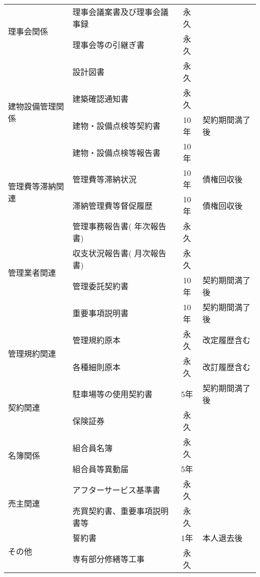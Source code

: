 \documentclass[12pt,uplatex]{jsarticle}
\begin{document}
\begin{table}[htbp]
{\begin{tabular}{|l|l|c|l|}
                                \hline
      \multirow{2}{*}{理事会関係} & 理事会議案書及び理事会議事録 & 永久 &  \\ \cline{2-4}
                                & 理事会等の引継ぎ書 & 永久 & \\ \cline{2-4}
                                \hline
      \multirow{4}{*}{建物設備管理関係} & 設計図書 & 永久 & \\ \cline{2-4}
                                & 建築確認通知書 & 永久 & \\ \cline{2-4}
                                & 建物・設備点検等契約書 & 10年 & 契約期間満了後 \\ \cline{2-4}
                                & 建物・設備点検等報告書 & 10年 & \\ \cline{2-4}
                                \hline
      \multirow{2}{*}{管理費等滞納関連} & 管理費等滞納状況 & 10年 &  債権回収後 \\ \cline{2-4}
                                & 滞納管理費等督促履歴 & 10年 & 債権回収後\\ \cline{2-4}
                                \hline
      \multirow{4}{*}{管理業者関連} & 管理事務報告書( 年次報告書) & 永久 & \\ \cline{2-4}
                                & 収支状況報告書( 月次報告書) & 永久 & \\ \cline{2-4}
                                & 管理委託契約書 & 10年 & 契約期間満了後 \\ \cline{2-4}
                                &  重要事項説明書 & 10年 & 契約期間満了後 \\ \cline{2-4}
                                \hline
      \multirow{2}{*}{管理規約関連} & 管理規約原本 & 永久 & 改定履歴含む \\ \cline{2-4}
                                & 各種細則原本 & 永久 & 改訂履歴含む \\ \cline{2-4}
                                \hline
      \multirow{2}{*}{契約関連} & 駐車場等の使用契約書 & 5年 & 契約期間満了後 \\ \cline{2-4}
                                &  保険証券 & 永久 &  \\ \cline{2-4}
                                \hline
      \multirow{2}{*}{名簿関係} & 組合員名簿 & 永久 &  \\ \cline{2-4}
                                &  組合員等異動届 & 5年 &  \\ \cline{2-4}
                                \hline
      \multirow{2}{*}{売主関連} & アフターサービス基準書 & 永久 &  \\ \cline{2-4}
                                & 売買契約書、重要事項説明書等 & 永久 &  \\ \cline{2-4}
                                \hline
      \multirow{2}{*}{その他} & 誓約書 & 1年 & 本人退去後 \\ \cline{2-4}
                                &  専有部分修繕等工事 & 永久 & \\ \cline{2-4}
                                \hline
    \end{tabular}
  }
\end{table}
\end{document}
